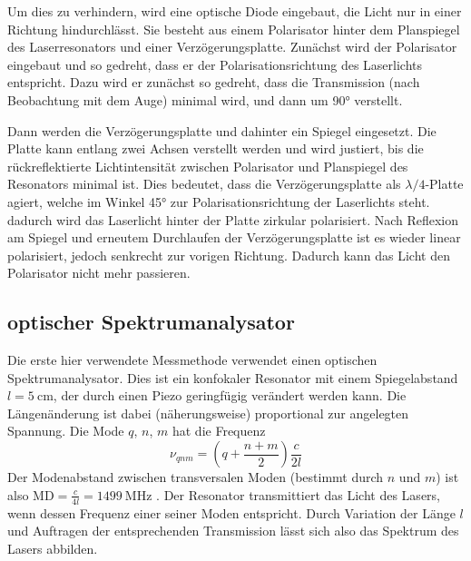 \documentclass{article}
\newcommand{\mr}{\mathrm}
\begin{document}
Um dies zu verhindern, wird eine optische Diode eingebaut, die Licht nur in einer Richtung hindurchlässt.
Sie besteht aus einem Polarisator hinter dem Planspiegel des Laserresonators und einer Verzögerungsplatte.
Zunächst wird der Polarisator eingebaut und so gedreht, dass er der Polarisationsrichtung des Laserlichts entspricht.
Dazu wird er zunächst so gedreht, dass die Transmission (nach Beobachtung mit dem Auge) minimal wird,
und dann um \ang{90} verstellt.

Dann werden die Verzögerungsplatte und dahinter ein Spiegel eingesetzt.
Die Platte kann entlang zwei Achsen verstellt werden und wird justiert, bis die rückreflektierte
Lichtintensität zwischen Polarisator und Planspiegel des Resonators minimal ist. Dies bedeutet,
dass die Verzögerungsplatte als $\lambda/4$-Platte agiert, welche im Winkel \ang{45} zur Polarisationsrichtung
der Laserlichts steht. dadurch wird das Laserlicht hinter der Platte zirkular polarisiert. Nach Reflexion
am Spiegel und erneutem Durchlaufen der Verzögerungsplatte ist es wieder linear polarisiert,
jedoch senkrecht zur vorigen Richtung. Dadurch kann das Licht den Polarisator nicht mehr passieren.


\subsection{optischer Spektrumanalysator}
Die erste hier verwendete Messmethode verwendet einen optischen Spektrumanalysator.
Dies ist ein konfokaler Resonator mit einem Spiegelabstand $l=\SI{5}{\cm}$, der durch einen Piezo geringfügig verändert werden kann.
Die Längenänderung ist dabei (näherungsweise) proportional zur angelegten Spannung.
Die Mode $q$, $n$, $m$ hat die Frequenz
\begin{equation}
  \nu_{qnm} = \left(q + \frac{n + m}{2}\right)\frac{c}{2l}
\end{equation}
Der Modenabstand zwischen transversalen Moden (bestimmt durch $n$ und $m$)
ist also $\mr{MD} = \frac{c}{4l} = \SI{1499}{\MHz}$ \cite{Anleitung}.
Der Resonator transmittiert das Licht des Lasers, wenn dessen Frequenz einer seiner Moden entspricht.
Durch Variation der Länge $l$ und Auftragen der entsprechenden Transmission lässt sich also das Spektrum des Lasers abbilden.
\end{document}
